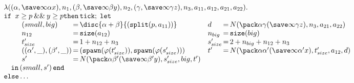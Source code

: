 \begin{small}
  $$
\begin{array}{l}
\lambda ((\alpha,\save \infty \alpha x),n_1,(\beta,\save \infty \beta y),n_2,(\gamma,\save \infty \gamma z),n_3,a_{11},a_{12},a_{21},a_{22}).\\
\texttt{if } x \geq p \mathbin{\&\&} y \geq p \texttt{then} \, \texttt{tick} ; \; \texttt{let}\\
 \hspace{2em} 
 \begin{array}{l@{\,}c@{\,}ll@{\,}c@{\,}l}
 (small,big) &=& \disc {\alpha + \beta} {(\texttt{split}(p,a_{11}))} & 
 d &=& N(\pack \alpha \gamma {(\save \infty \gamma z)},n_3,a_{21},a_{22})\\
 n_{12} &=& \texttt{size}(a_{12}) &
 n_{big} &=& \texttt{size}(big)\\
 t'_{size} &=& 1 + n_{12} + n_3 &
 s'_{size} &=& 2 + n_{big} + n_{12} + n_3\\
 ((\alpha',\_),(\beta',\_)) &=& (\texttt{spawn}(\varphi(t'_{size})),\texttt{spawn}(\varphi(s'_{size}))) &
 t' &=& N(\pack \alpha {\alpha'} {(\save \infty {\alpha'} x)},t'_{size},a_{12},d)\\
 s' &=& N(\pack \alpha {\beta'} {(\save \infty {\beta'} y)},s'_{size},big,t')
 \end{array} \\
\hspace{1em}\texttt{in} \, (small,s') \, \texttt{end}\\
\texttt{else} \ldots
\end{array}
$$
\end{small}
